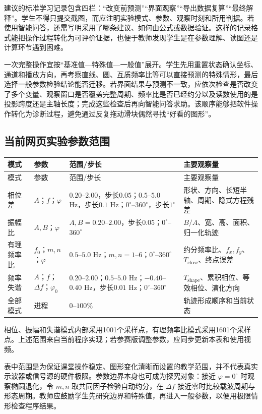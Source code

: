 \documentclass[UTF8,a4paper,zihao=-4]{ctexart}
\begin{document}
建议的标准学习记录包含四栏：“改变前预测”“界面观察”“导出数据复算”“最终解释”。学生不得只提交截图，而应注明实验模式、参数、观察时刻和所用判据。若使用智能问答，还需写明采用了哪条建议、如何由公式或数据验证。这样的记录格式能把操作过程转化为可评价证据，也便于教师发现学生是在参数理解、读图还是计算环节遇到困难。

一次完整操作宜按“基准值—特殊值—一般值”展开。学生先用重置状态确认坐标、通道和播放方向，再考察直线、圆、互质频率比等可以直接预测的特殊情形，最后选择一般参数检验结论能否迁移。若界面结果与预测不一致，应依次检查是否改变了多个变量、观察窗口是否覆盖完整周期、频率比是否已经约分以及读数使用的是投影跨度还是主轴长度；完成这些检查后再向智能问答求助。该顺序能够把软件操作转化为诊断过程，避免通过反复拖动滑块偶然寻找“好看的图形”。

\subsection{当前网页实验参数范围}
\begin{longtable}{p{3.2cm}p{3.0cm}p{3.6cm}p{4.2cm}}
\toprule
模式 & 参数 & 范围/步长 & 主要观察量\\
\midrule
\endfirsthead
\toprule
模式 & 参数 & 范围/步长 & 主要观察量\\
\midrule
\endhead
相位差 & $A$；$f$；$\varphi$ & $0.20$--$2.00$，步长$0.05$；$0.5$--$5.0$ Hz，步长$0.1$ Hz；$0^\circ$--$360^\circ$，步长$1^\circ$ & 形状、方向、长短半轴、周期、隐式方程残差\\
振幅比 & $A,B$；$\varphi$ & $A,B=0.20$--$2.00$，步长$0.05$；$0^\circ$--$360^\circ$ & $B/A$、宽、高、面积、归一化轨迹\\
有理频率比 & $f_0$；$m,n$；$\varphi$ & $0.5$--$5.0$ Hz；$m,n=1$--$6$；$0^\circ$--$360^\circ$ & 约分频率比、$f_x,f_y$、$T_{\mathrm{close}}$、终点误差\\
频率失谐 & $A$；$f$；$\Delta f$；$\varphi_0$ & $0.20$--$2.00$；$0.5$--$5.0$ Hz；$-0.40$--$0.40$ Hz，步长$0.01$ Hz；$0^\circ$--$360^\circ$ & $T_{\mathrm{shape}}$、累积相位、等效相位、演化方向\\
全部模式 & 进程 & $0$--$100\%$ & 轨迹形成顺序和当前状态\\
\bottomrule
\end{longtable}
相位、振幅和失谐模式内部采用1001个采样点，有理频率比模式采用1601个采样点。上述范围来自当前程序实现；若参赛版调整参数，应同步更新本表和使用视频。

表中范围是为保证课堂操作稳定、图形变化清晰而设置的教学范围，并不代表真实示波器或信号源的硬件极限。参数边界本身也可成为探究对象：接近 $\varphi=0^\circ$ 时观察椭圆退化，令 $m,n$ 取共同因子检验自动约分，在 $\Delta f$ 接近零时比较载波周期与形态周期。教师应鼓励学生先研究边界和特殊值，再进入一般参数，以便用极限情形检查程序结果。
\end{document}
